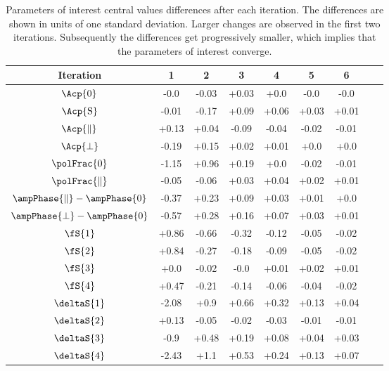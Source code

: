 \begin{table}[!h]
\centering
\footnotesize
\begin{tabular}{ c c c c c c c c c }
  \hline
  Iteration          &       1       &       2       &       3       &       4       &       5       &       6 \\
  \hline
  $\Acp{0}$                           &  -0.0   &  -0.03  &  +0.03  &  +0.0   &  -0.0   &  -0.0    \\
  $\Acp{\text{S}}$                    &  -0.01  &  -0.17  &  +0.09  &  +0.06  &  +0.03  &  +0.01   \\
  $\Acp{\parallel}$                   &  +0.13  &  +0.04  &  -0.09  &  -0.04  &  -0.02  &  -0.01   \\
  $\Acp{\perp}$                       &  -0.19  &  +0.15  &  +0.02  &  +0.01  &  +0.0   &  +0.0    \\
  $\polFrac{0}$                       &  -1.15  &  +0.96  &  +0.19  &  +0.0   &  -0.02  &  -0.01   \\
  $\polFrac{\parallel}$               &  -0.05  &  -0.06  &  +0.03  &  +0.04  &  +0.02  &  +0.01   \\
  $\ampPhase{\parallel}-\ampPhase{0}$ &  -0.37  &  +0.23  &  +0.09  &  +0.03  &  +0.01  &  +0.0    \\
  $\ampPhase{\perp}-\ampPhase{0}$     &  -0.57  &  +0.28  &  +0.16  &  +0.07  &  +0.03  &  +0.01   \\
  $\fS{1}$                            &  +0.86  &  -0.66  &  -0.32  &  -0.12  &  -0.05  &  -0.02   \\
  $\fS{2}$                            &  +0.84  &  -0.27  &  -0.18  &  -0.09  &  -0.05  &  -0.02   \\
  $\fS{3}$                            &  +0.0   &  -0.02  &  -0.0   &  +0.01  &  +0.02  &  +0.01   \\
  $\fS{4}$                            &  +0.47  &  -0.21  &  -0.14  &  -0.06  &  -0.04  &  -0.02   \\
  $\deltaS{1}$                        &  -2.08  &  +0.9   &  +0.66  &  +0.32  &  +0.13  &  +0.04   \\
  $\deltaS{2}$                        &  +0.13  &  -0.05  &  -0.02  &  -0.03  &  -0.01  &  -0.01   \\
  $\deltaS{3}$                        &  -0.9   &  +0.48  &  +0.19  &  +0.08  &  +0.04  &  +0.03   \\
  $\deltaS{4}$                        &  -2.43  &  +1.1   &  +0.53  &  +0.24  &  +0.13  &  +0.07   \\
  \hline
\end{tabular}
\caption{Parameters of interest central values differences after each iteration. The differences are shown in units of one
         standard deviation. Larger changes are observed in the first two iterations. Subsequently the differences get progressively
         smaller, which implies that the parameters of interest converge.}
\label{pars_convergence}
\end{table}

